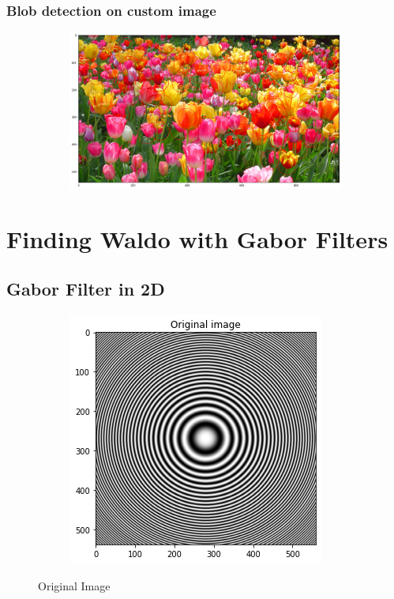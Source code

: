\documentclass[12pt, oneside]{article}
\begin{document}
\subsubsection{Blob detection on custom image}
\begin{figure}[H]
    \centering
    \begin{subfigure}[b]{1\textwidth}
        \centering
        \includegraphics[width=\textwidth]{imgs/q1.3_plot2.png}
    \end{subfigure}
    \caption{}
\end{figure}

\section{Finding Waldo with Gabor Filters}

\subsection{Gabor Filter in 2D}
\begin{figure}[H]
    \centering
    \begin{subfigure}[b]{0.25\textwidth}
        \centering
        \includegraphics[width=\textwidth]{imgs/q2.1_plot1.png}
    \end{subfigure}
    \caption{Original Image}
\end{figure}
\end{document}
